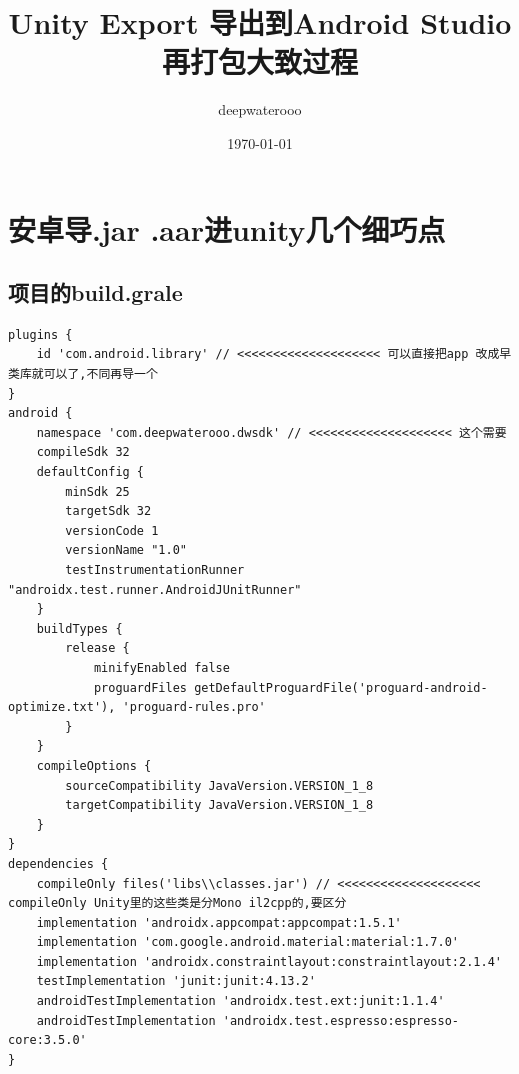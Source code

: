 \documentclass[9pt, b5paper]{article}
\author{deepwaterooo}
\date{\today}
\title{Unity Export 导出到Android Studio再打包大致过程}
\begin{document}
\maketitle
\tableofcontents


\section{安卓导.jar .aar进unity几个细巧点}
\label{sec-1}
\subsection{项目的build.grale}
\label{sec-1-1}
\begin{verbatim}
plugins {
    id 'com.android.library' // <<<<<<<<<<<<<<<<<<<< 可以直接把app 改成早类库就可以了,不同再导一个
}
android {
    namespace 'com.deepwaterooo.dwsdk' // <<<<<<<<<<<<<<<<<<<< 这个需要
    compileSdk 32
    defaultConfig {
        minSdk 25
        targetSdk 32
        versionCode 1
        versionName "1.0"
        testInstrumentationRunner "androidx.test.runner.AndroidJUnitRunner"
    }
    buildTypes {
        release {
            minifyEnabled false
            proguardFiles getDefaultProguardFile('proguard-android-optimize.txt'), 'proguard-rules.pro'
        }
    }
    compileOptions {
        sourceCompatibility JavaVersion.VERSION_1_8
        targetCompatibility JavaVersion.VERSION_1_8
    }
}
dependencies {
    compileOnly files('libs\\classes.jar') // <<<<<<<<<<<<<<<<<<<< compileOnly Unity里的这些类是分Mono il2cpp的,要区分
    implementation 'androidx.appcompat:appcompat:1.5.1'
    implementation 'com.google.android.material:material:1.7.0'
    implementation 'androidx.constraintlayout:constraintlayout:2.1.4'
    testImplementation 'junit:junit:4.13.2'
    androidTestImplementation 'androidx.test.ext:junit:1.1.4'
    androidTestImplementation 'androidx.test.espresso:espresso-core:3.5.0'
}
\end{verbatim}
\end{document}
